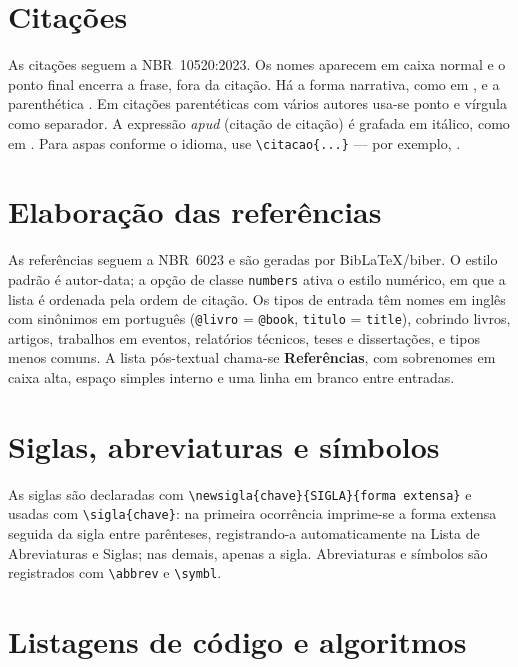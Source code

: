 \documentclass[dsc]{coppe}
\begin{document}
  \chapter{Citações}

  As citações seguem a \mbox{NBR~10520:2023}. Os nomes aparecem em caixa normal e
  o ponto final encerra a frase, fora da citação. Há a forma narrativa, como em
  \citet{article-example}, e a parenthética \citep{book-example}. Em citações
  parentéticas com vários autores usa-se ponto e vírgula como separador. A
  expressão \emph{apud} (citação de citação) é grafada em itálico, como em
  . Para aspas conforme o
  idioma, use \verb|\citacao{...}| --- por exemplo, .

  \chapter{Elaboração das referências}

  As referências seguem a \mbox{NBR~6023} e são geradas por BibLaTeX/biber. O
  estilo padrão é autor-data; a opção de classe \verb|numbers| ativa o estilo
  numérico, em que a lista é ordenada pela ordem de citação. Os tipos de entrada
  têm nomes em inglês com sinônimos em português (\verb|@livro| = \verb|@book|,
  \verb|titulo| = \verb|title|), cobrindo livros, artigos, trabalhos em eventos,
  relatórios técnicos, teses e dissertações, e tipos menos comuns. A lista
  pós-textual chama-se \textbf{Referências}, com sobrenomes em caixa alta, espaço
  simples interno e uma linha em branco entre entradas.

  \nocite{*}

  \chapter{Siglas, abreviaturas e símbolos}

  As siglas são declaradas com \verb|\newsigla{chave}{SIGLA}{forma extensa}| e
  usadas com \verb|\sigla{chave}|: na primeira ocorrência imprime-se a forma
  extensa seguida da sigla entre parênteses, registrando-a automaticamente na
  Lista de Abreviaturas e Siglas; nas demais, apenas a sigla. Abreviaturas e
  símbolos são registrados com \verb|\abbrev| e \verb|\symbl|.


  \chapter{Listagens de código e algoritmos}
\end{document}
